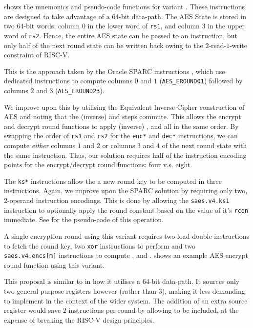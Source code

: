 
 shows the mnemonics and pseudo-code functions
for variant .
These instructions are designed to take advantage of a 64-bit
data-path.
The AES State is stored in two $64$-bit words: column $0$ in the
lower word of {\tt rs1}, and column $3$ in the upper word of {\tt rs2}.
Hence, the entire AES state can be passed to an instruction, but only
half of the next round state can be written back owing to the
$2$-read-$1$-write constraint of RISC-V.

This is the approach taken by the Oracle SPARC instructions
\cite[Page 109]{SPARC:16}, which use dedicated instructions to compute
columns $0$ and $1$ ({\tt AES\_EROUND01}) followed by
columns $2$ and $3$ ({\tt AES\_EROUND23}).

We improve upon this by utilising the Equivalent Inverse Cipher
construction of AES \cite[Section 5.4.4, Page 27]{FIPS:197}
and noting that the (inverse)  and  steps commute.
This allows the encrypt and decrypt round functions to apply (inverse)
,  and  all in the same order.
By swapping the order of {\tt rs1} and {\tt rs2}
for the {\tt enc*} and {\tt dec*} instructions, we can compute {\em either}
columns $1$ and $2$ or columns $3$ and $4$ of the next round state with the
same instruction.
Thus, our solution requires half of the instruction encoding points
for the encrypt/decrypt round functions: four v.s. eight.

The {\tt ks*} instructions allow the a new round key to be computed
in three instructions.
Again, we improve upon the SPARC solution by requiring only two,
$2$-operand instruction encodings.
This is done by allowing the {\tt saes.v4.ks1} instruction
to optionally apply the round constant based on the value of
it's {\tt rcon} immediate.
See  for the pseudo-code of this
operation.

A single encryption round using this variant requires
two load-double instructions to fetch the round key,
two {\tt xor} instructions to perform 
and
two {\tt saes.v4.encs[m]} instructions to compute , 
and .
 shows an example AES encrypt round function
using this variant.

This proposal is similar to \cite{SPARC:16} in how it utilises
a 64-bit data-path.
It sources only two general purpose registers however (rather than $3$),
making it less demanding to implement in the context of the wider
system.
The addition of an extra source register would save $2$ instructions
per round by allowing  to be included, at the expense
of breaking the RISC-V design principles.

